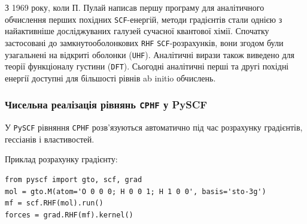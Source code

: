 \begin{commentbox}
З 1969 року, коли П. Пулай написав першу програму для аналітичного обчислення перших похідних \texttt{SCF}-енергій, методи градієнтів стали однією з найактивніше досліджуваних галузей сучасної квантової хімії. Спочатку застосовані до замкнутооболонкових \texttt{RHF}  \texttt{SCF}-розрахунків, вони згодом були узагальнені на відкриті оболонки (\texttt{UHF}). Аналітичні вирази також виведено для теорії функціоналу густини (\texttt{DFT}). Сьогодні аналітичні перші та другі похідні енергії доступні для більшості рівнів ab initio обчислень.
\end{commentbox}


\subsubsection{Чисельна реалізація рівнянь \texttt{CPHF} у PySCF}

У \texttt{PySCF} рівняння \texttt{CPHF} розв’язуються автоматично під час розрахунку градієнтів, гессіанів і властивостей.


Приклад розрахунку градієнту:
\begin{verbatim}
from pyscf import gto, scf, grad
mol = gto.M(atom='O 0 0 0; H 0 0 1; H 1 0 0', basis='sto-3g')
mf = scf.RHF(mol).run()
forces = grad.RHF(mf).kernel()
\end{verbatim}
%
%

